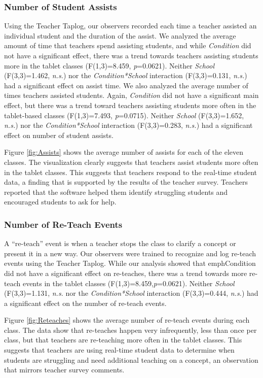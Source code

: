 \documentclass{sigchi}
\begin{document}
\subsubsection{Number of Student Assists}
Using the Teacher Taplog, our observers recorded each time a teacher assisted an individual student and the duration of the assist. We analyzed the average amount of time that teachers spend assisting students, and while \emph{Condition} did not have a significant effect, there was a trend towards teachers assisting students more in the tablet classes (F(1,3)=8.459, \emph{p}=0.0621). Neither \emph{School} (F(3,3)=1.462, \emph{n.s.}) nor the \emph{Condition*School} interaction (F(3,3)=0.131, \emph{n.s.}) had a significant effect on assist time. We also analyzed the average number of times teachers assisted students. Again, \emph{Condition} did not have a significant main effect, but there was a trend toward teachers assisting students more often in the tablet-based classes (F(1,3)=7.493, \emph{p}=0.0715). Neither \emph{School} (F(3,3)=1.652, \emph{n.s.}) nor the \emph{Condition*School} interaction (F(3,3)=0.283, \emph{n.s.}) had a significant effect on number of student assists. 

Figure \ref{fig:Assists} shows the average number of assists for each of the eleven classes. The visualization clearly suggests that teachers assist students more often in the tablet classes. This suggests that teachers respond to the real-time student data, a finding that is supported by the results of the teacher survey. Teachers reported that the software helped them identify struggling students and encouraged students to ask for help.



\subsubsection{Number of Re-Teach Events}
A ``re-teach'' event is when a teacher stops the class to clarify a concept or present it in a new way. Our observers were trained to recognize and log re-teach events using the Teacher Taplog. While our analysis showed that emph{Condition} did not have a significant effect on re-teaches, there was a trend towards more re-teach events in the tablet classes (F(1,3)=8.459,\emph{p}=0.0621). Neither \emph{School} (F(3,3)=1.131, \emph{n.s.} nor the \emph{Condition*School} interaction (F(3,3)=0.444, \emph{n.s.}) had a significant effect on the number of re-teach events.

Figure \ref{fig:Reteaches} shows the average number of re-teach events during each class. The data show that re-teaches happen very infrequently, less than once per class, but that teachers are re-teaching more often in the tablet classes. This suggests that teachers are using real-time student data to determine when students are struggling and need additional teaching on a concept, an observation that mirrors teacher survey comments.
\end{document}
